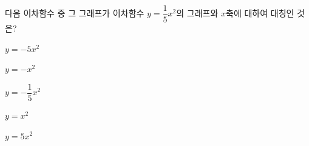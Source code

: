 다음 이차함수 중 그 그래프가 이차함수 $y=\dfrac{1}{5}x^2$의 그래프와 $x$축에 대하여 대칭인 것은?
\begin{choices32}{\rule[-3ex]{0pt}{8ex}$y=-5x^2$}{\rule[-3ex]{0pt}{8ex}$y=-x^2$}{\rule[-3ex]{0pt}{8ex}$y=-\dfrac{1}{5}x^2$}{\rule[-3ex]{0pt}{8ex}$y=x^2$}{\rule[-3ex]{0pt}{8ex}$y=5x^2$}\end{choices32}
